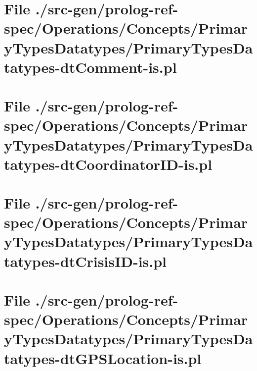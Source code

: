 \section[File /src-gen/prolog-ref-spec.../PrimaryTypesDatatypes-dtComment-is.pl]{File ./src-gen/prolog-ref-spec/Operations/Concepts/PrimaryTypesDatatypes/PrimaryTypesDatatypes-dtComment-is.pl}
\scriptsize

\normalsize
	
\section[File /src-gen/prolog-ref-spec.../PrimaryTypesDatatypes-dtCoordinatorID-is.pl]{File ./src-gen/prolog-ref-spec/Operations/Concepts/PrimaryTypesDatatypes/PrimaryTypesDatatypes-dtCoordinatorID-is.pl}
\scriptsize

\normalsize
	
\section[File /src-gen/prolog-ref-spec.../PrimaryTypesDatatypes-dtCrisisID-is.pl]{File ./src-gen/prolog-ref-spec/Operations/Concepts/PrimaryTypesDatatypes/PrimaryTypesDatatypes-dtCrisisID-is.pl}
\scriptsize

\normalsize
	
\section[File /src-gen/prolog-ref-spec.../PrimaryTypesDatatypes-dtGPSLocation-is.pl]{File ./src-gen/prolog-ref-spec/Operations/Concepts/PrimaryTypesDatatypes/PrimaryTypesDatatypes-dtGPSLocation-is.pl}
\scriptsize

\normalsize
	
